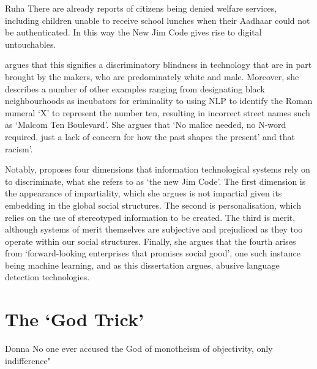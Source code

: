 \begin{citequote}{Ruha \citet[p. 133]{Benjamin:2019}}
  There are already reports of citizens being denied welfare services, including children unable to receive school lunches when their Aadhaar could not be authenticated. In this way the New Jim Code gives rise to digital untouchables.
\end{citequote}

\citet{Benjamin:2019} argues that this signifies a discriminatory blindness in technology that are in part brought by the makers, who are predominately white and male.
Moreover, she describes a number of other examples ranging from designating black neighbourhoods as incubators for criminality to using NLP to identify the Roman numeral `X' to represent the number ten, resulting in incorrect street names such as `Malcom Ten Boulevard'.
She argues that `No malice needed, no N-word required, just a lack of concern for how the past shapes the present' and that racism'.

Notably, \citet{Benjamin:2019} proposes four dimensions that information technological systems rely on to discriminate, what she refers to as `the new Jim Code'.
The first dimension is the appearance of impartiality, which she argues is not impartial given its embedding in the global social structures.
The second is personalisation, which relies on the use of stereotyped information to be created.
The third is merit, although systems of merit themselves are subjective and prejudiced as they too operate within our social structures.
Finally, she argues that the fourth arises from `forward-looking enterprises that promises social good', one such instance being machine learning, and as this dissertation argues, abusive language detection technologies.

\section{The `God Trick'}

\begin{citequote}{Donna \citet{Haraway:1988}}
  No one ever accused the God of monotheism of objectivity, only indifference"
\end{citequote}

